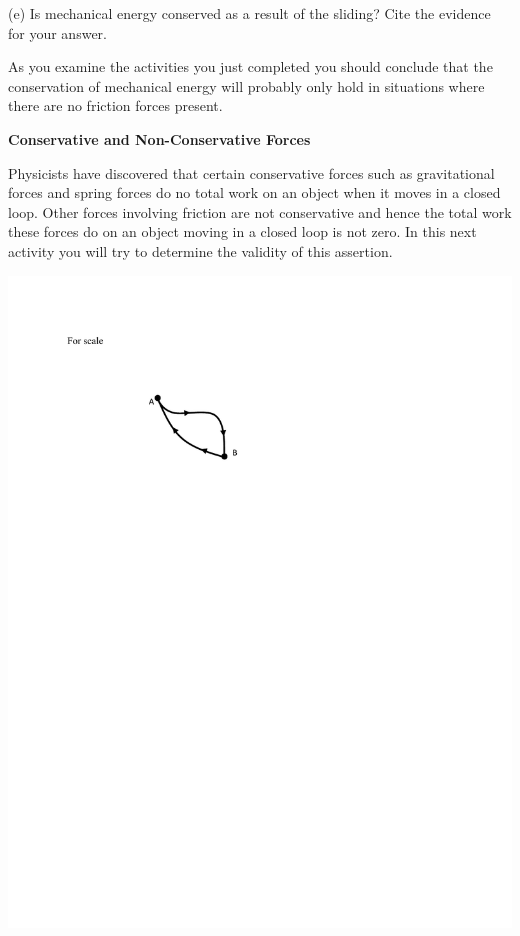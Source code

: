 (e) Is mechanical energy conserved as a result of the sliding? Cite the evidence for your answer.
\answerspace{20mm}

As you examine the activities you just completed you should conclude that the
conservation of mechanical energy will probably only hold in situations where
there are no friction forces present. 

\textbf{Conservative and Non-Conservative Forces} 

Physicists have discovered that certain conservative forces such as gravitational forces and spring forces do no total work on an object when it moves in a closed loop. Other forces involving friction are not conservative and hence the total work these forces do on an object moving in a closed loop is not zero. In this next activity you will try to determine the validity of this assertion.

{\par\centering \includegraphics{conservative/two_paths.pdf} \par}

